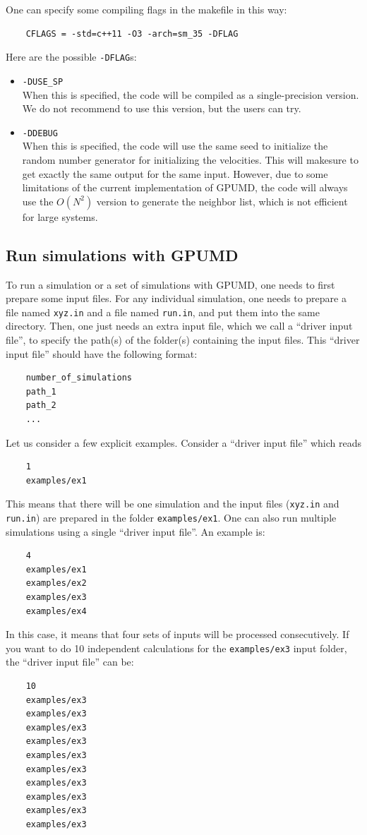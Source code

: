 \documentclass[12pt,a4paper]{report}
\begin{document}
One can specify some compiling flags in the makefile in this way:
\begin{verbatim}
    CFLAGS = -std=c++11 -O3 -arch=sm_35 -DFLAG
\end{verbatim}
Here are the possible \verb"-DFLAG"s:
\begin{itemize}
\item \verb"-DUSE_SP"\\
When this is specified, the code will be compiled as a single-precision version. We do not recommend to use this version, but the users can try.
\item \verb"-DDEBUG"\\
When this is specified, the code will use the same seed to initialize the random number generator for initializing the velocities. This will makesure to get exactly the same output for the same input. However, due to some limitations of the current implementation of GPUMD, the code will always use the $O(N^2)$ version to generate the neighbor list, which is not efficient for large systems. 
\end{itemize}


\subsection{Run simulations with GPUMD}

To run a simulation or a set of simulations with GPUMD, one needs to first prepare some input files. For any individual simulation, one needs to prepare a file named \verb"xyz.in" and a file named \verb"run.in", and put them into the same directory. Then, one just needs an extra input file, which we call a ``driver input file'', to specify the path(s) of the folder(s) containing the input files. This ``driver input file'' should have the following format:
\begin{verbatim}
    number_of_simulations
    path_1
    path_2
    ...
\end{verbatim}


Let us consider a few explicit examples. Consider a ``driver input file'' which reads
\begin{verbatim}
    1
    examples/ex1
\end{verbatim}
This means that there will be one simulation and the input files (\verb"xyz.in" and \verb"run.in") are prepared in the folder \verb"examples/ex1". One can also run multiple simulations using a single ``driver input file''. An example is:
\begin{verbatim}
    4
    examples/ex1
    examples/ex2
    examples/ex3
    examples/ex4
\end{verbatim}
In this case, it means that four sets of inputs will be processed consecutively. If you want to do 10 independent calculations for the \verb"examples/ex3" input folder, the ``driver input file'' can be:
\begin{verbatim}
    10
    examples/ex3
    examples/ex3
    examples/ex3
    examples/ex3
    examples/ex3
    examples/ex3
    examples/ex3
    examples/ex3
    examples/ex3
    examples/ex3
\end{verbatim}
\end{document}

